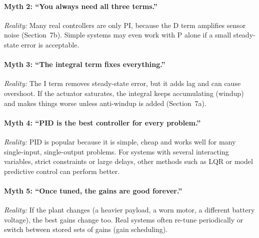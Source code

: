 \documentclass[]{article}
\begin{document}
\paragraph{Myth 2: ``You always need all three terms.''}
\emph{Reality:} Many real controllers are only PI, because the D term amplifies sensor noise (Section~7b). Simple systems may even work with P alone if a small steady-state error is acceptable.

\paragraph{Myth 3: ``The integral term fixes everything.''}
\emph{Reality:} The I term removes steady-state error, but it adds lag and can cause overshoot. If the actuator saturates, the integral keeps accumulating (windup) and makes things worse unless anti-windup is added (Section~7a).

\paragraph{Myth 4: ``PID is the best controller for every problem.''}
\emph{Reality:} PID is popular because it is simple, cheap and works well for many single-input, single-output problems. For systems with several interacting variables, strict constraints or large delays, other methods such as LQR or model predictive control can perform better.

\paragraph{Myth 5: ``Once tuned, the gains are good forever.''}
\emph{Reality:} If the plant changes (a heavier payload, a worn motor, a different battery voltage), the best gains change too. Real systems often re-tune periodically or switch between stored sets of gains (gain scheduling).
\end{document}
